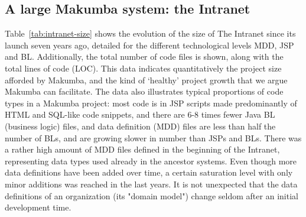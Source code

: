 \documentclass{chi2009}
\begin{document}
\subsection{A large Makumba system: the Intranet}
Table~\ref{tab:intranet-size} shows the evolution of the size of The Intranet since its launch seven years ago, detailed for the different technological levels MDD, JSP and BL. Additionally, the total number of code files is shown, along with the total lines of code (LOC). This data indicates quantitatively the project size afforded by Makumba, and the kind of `healthy' project growth that we argue Makumba can facilitate. The data also illustrates typical proportions of code types in a Makumba project: most code is in JSP scripts made predominantly of HTML and SQL-like code snippets, and there are 6-8 times fewer Java BL (business logic) files, and data definition (MDD) files are less than half the number of BLs, and are growing slower in number than JSPs and BLs. There was a rather high amount of MDD files defined in the beginning of the Intranet, representing data types used already in the ancestor systems. Even though more data definitions have been added over time, a certain saturation level with only minor additions was reached in the last years. It is not unexpected that the data definitions of an organization (its "domain model") change seldom after an initial development time. 
\end{document}
